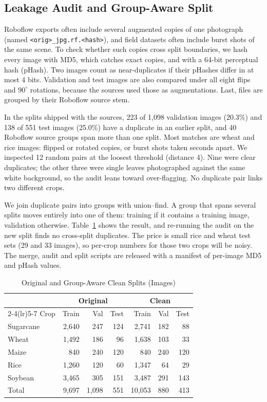 \documentclass[conference]{IEEEtran}
\begin{document}
\subsection{Leakage Audit and Group-Aware Split}

Roboflow exports often include several augmented copies of one photograph (named \texttt{<orig>\_jpg.rf.<hash>}), and field datasets often include burst shots of the same scene. To check whether such copies cross split boundaries, we hash every image with MD5, which catches exact copies, and with a 64-bit perceptual hash (pHash). Two images count as near-duplicates if their pHashes differ in at most 4 bits. Validation and test images are also compared under all eight flips and $90^\circ$ rotations, because the sources used those as augmentations. Last, files are grouped by their Roboflow source stem.

In the splits shipped with the sources, 223 of 1,098 validation images (20.3\%) and 138 of 551 test images (25.0\%) have a duplicate in an earlier split, and 40 Roboflow source groups span more than one split. Most matches are wheat and rice images: flipped or rotated copies, or burst shots taken seconds apart. We inspected 12 random pairs at the loosest threshold (distance 4). Nine were clear duplicates; the other three were single leaves photographed against the same white background, so the audit leans toward over-flagging. No duplicate pair links two different crops.

We join duplicate pairs into groups with union--find. A group that spans several splits moves entirely into one of them: training if it contains a training image, validation otherwise. Table~\ref{tab:split} shows the result, and re-running the audit on the new split finds no cross-split duplicates. The price is small rice and wheat test sets (29 and 33 images), so per-crop numbers for those two crops will be noisy. The merge, audit and split scripts are released with a manifest of per-image MD5 and pHash values.

\begin{table}[t]
\caption{Original and Group-Aware Clean Splits (Images)}
\label{tab:split}
\centering
\setlength{\tabcolsep}{4pt}
\begin{tabular}{lrrrrrr}
\toprule
& \multicolumn{3}{c}{Original} & \multicolumn{3}{c}{Clean} \\
\cmidrule(lr){2-4}\cmidrule(lr){5-7}
Crop & Train & Val & Test & Train & Val & Test \\
\midrule
Sugarcane & 2,640 & 247 & 124 & 2,741 & 182 & 88 \\
Wheat & 1,492 & 186 & 96 & 1,638 & 103 & 33 \\
Maize & 840 & 240 & 120 & 840 & 240 & 120 \\
Rice & 1,260 & 120 & 60 & 1,347 & 64 & 29 \\
Soybean & 3,465 & 305 & 151 & 3,487 & 291 & 143 \\
\midrule
Total & 9,697 & 1,098 & 551 & 10,053 & 880 & 413 \\
\bottomrule
\end{tabular}
\end{table}
\end{document}
